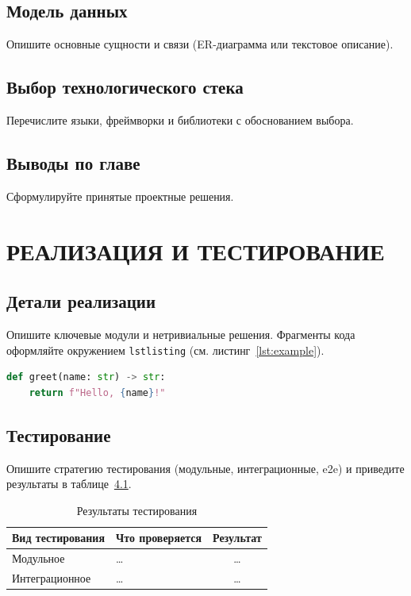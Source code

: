 \documentclass[12pt,a4paper]{extreport}
\begin{document}
\section{Модель данных}
Опишите основные сущности и связи (ER-диаграмма или текстовое
описание).

\section{Выбор технологического стека}
Перечислите языки, фреймворки и библиотеки с обоснованием выбора.

\section{Выводы по главе}
Сформулируйте принятые проектные решения.

\clearpage

\chapter{РЕАЛИЗАЦИЯ И ТЕСТИРОВАНИЕ}

\section{Детали реализации}
Опишите ключевые модули и нетривиальные решения. Фрагменты кода
оформляйте окружением \texttt{lstlisting} (см. листинг~\ref{lst:example}).

\begin{lstlisting}[language=Python, caption={Пример функции}, label={lst:example}]
def greet(name: str) -> str:
    return f"Hello, {name}!"
\end{lstlisting}

\section{Тестирование}
Опишите стратегию тестирования (модульные, интеграционные, e2e) и
приведите результаты в таблице~\ref{tab:test-results}.

\begin{table}[H]
\caption{Результаты тестирования}
\label{tab:test-results}
\centering
\begin{tabular}{|>{\raggedright\arraybackslash}p{4cm}|>{\raggedright\arraybackslash}p{8cm}|c|}
\hline
\textbf{Вид тестирования} & \textbf{Что проверяется} & \textbf{Результат} \\
\hline
Модульное & \ldots & \ldots \\
\hline
Интеграционное & \ldots & \ldots \\
\hline
\end{tabular}
\end{table}
\end{document}
